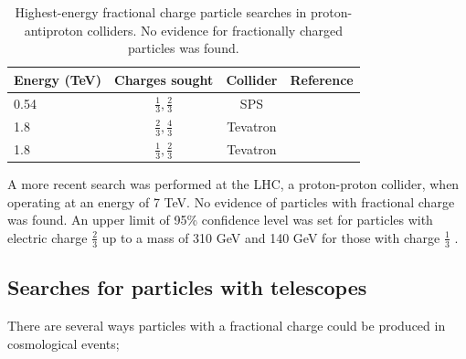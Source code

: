 \begin{table}[]
\caption{Highest-energy fractional charge particle searches in proton-antiproton colliders. No evidence for fractionally charged particles was found.}
\label{tab:protonantiprotoncollider}
\centering
\begin{tabular}{|l|c|c|c|}
\hline
\rowcolor[HTML]{9B9B9B} 
Energy (TeV) & Charges sought            & Collider & Reference \\ \hline
0.54		 & $\frac{1}{3},\frac{2}{3}$ & SPS      & \cite{Banner:1985ev} \\ \hline
1.8          & $\frac{2}{3},\frac{4}{3}$ & Tevatron & \cite{Abe:1992vr}         \\ \hline
1.8          & $\frac{1}{3},\frac{2}{3}$ & Tevatron & \cite{Acosta:2002ju} \\ \hline
\end{tabular}
\end{table}

A more recent search was performed at the LHC, a proton-proton collider, when operating at an energy of 7 TeV. No evidence of particles with fractional charge was found. An upper limit of 95\% confidence level was set for particles with electric charge $\frac{2}{3}$ up to a mass of 310 GeV and 140 GeV for those with charge $\frac{1}{3}$ \cite{CMS:2012xi}.

\subsection{Searches for particles with telescopes}
There are several ways particles with a fractional charge could be produced in cosmological events;

